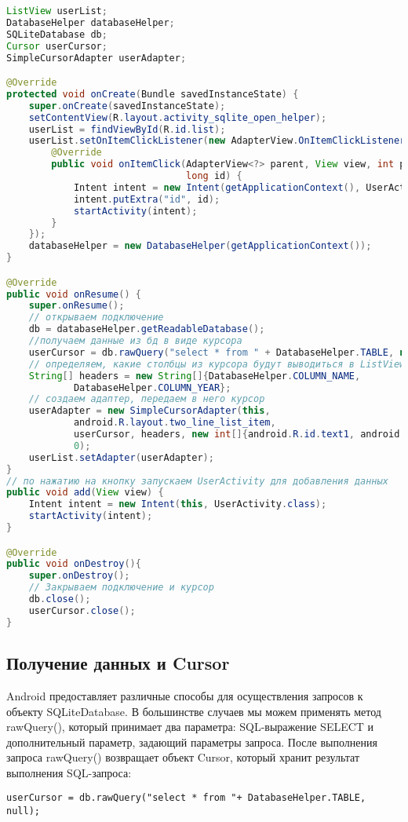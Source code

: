 \begin{lstlisting}[language=Java
	, label=lst:
	]
ListView userList;
DatabaseHelper databaseHelper;
SQLiteDatabase db;
Cursor userCursor;
SimpleCursorAdapter userAdapter;

@Override
protected void onCreate(Bundle savedInstanceState) {
	super.onCreate(savedInstanceState);
	setContentView(R.layout.activity_sqlite_open_helper);
	userList = findViewById(R.id.list);
	userList.setOnItemClickListener(new AdapterView.OnItemClickListener() {
		@Override
		public void onItemClick(AdapterView<?> parent, View view, int position,
								long id) {
			Intent intent = new Intent(getApplicationContext(), UserActivity.class);
			intent.putExtra("id", id);
			startActivity(intent);
		}
	});
	databaseHelper = new DatabaseHelper(getApplicationContext());
}

@Override
public void onResume() {
	super.onResume();
	// открываем подключение
	db = databaseHelper.getReadableDatabase();
	//получаем данные из бд в виде курсора
	userCursor = db.rawQuery("select * from " + DatabaseHelper.TABLE, null);
	// определяем, какие столбцы из курсора будут выводиться в ListView
	String[] headers = new String[]{DatabaseHelper.COLUMN_NAME,
			DatabaseHelper.COLUMN_YEAR};
	// создаем адаптер, передаем в него курсор
	userAdapter = new SimpleCursorAdapter(this,
			android.R.layout.two_line_list_item,
			userCursor, headers, new int[]{android.R.id.text1, android.R.id.text2},
			0);
	userList.setAdapter(userAdapter);
}
// по нажатию на кнопку запускаем UserActivity для добавления данных
public void add(View view) {
	Intent intent = new Intent(this, UserActivity.class);
	startActivity(intent);
}

@Override
public void onDestroy(){
	super.onDestroy();
	// Закрываем подключение и курсор
	db.close();
	userCursor.close();
}
\end{lstlisting}

\subsection{Получение данных и Cursor}
Android предоставляет различные способы для осуществления запросов к
объекту SQLiteDatabase. В большинстве случаев мы можем применять метод
rawQuery(), который принимает два параметра: SQL-выражение SELECT и
дополнительный параметр, задающий параметры запроса.
После выполнения запроса rawQuery() возвращает объект Cursor, который
хранит результат выполнения SQL-запроса:

\begin{verbatim}
userCursor = db.rawQuery("select * from "+ DatabaseHelper.TABLE, null);
\end{verbatim}

